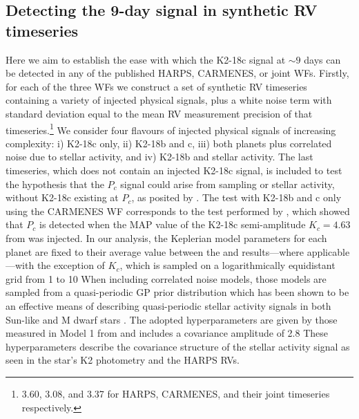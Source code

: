 \subsection{Detecting the 9-day signal in synthetic RV timeseries}
Here we aim to establish the ease with which the
K2-18c signal at $\sim 9$ days can be detected in any of the published HARPS,
CARMENES, or joint WFs. Firstly, for each of the three WFs we construct a set of synthetic RV
timeseries containing a variety of injected physical signals,
plus a white noise term with standard deviation equal to the mean
RV measurement precision of that timeseries.\footnote{ 3.60, 3.08, and 3.37 \mps{} for HARPS, CARMENES, and
  their joint timeseries respectively.} We consider four flavours of injected physical signals of increasing
complexity: i) K2-18c only, ii) K2-18b and c, iii) both planets plus correlated noise
due to stellar activity, and iv) K2-18b and stellar activity. The last timeseries, which does not contain an injected
K2-18c signal, is included to test the hypothesis that the $P_c$ signal could arise from sampling or stellar activity,
without K2-18c existing at $P_c$, as posited by .
The test with K2-18b and c only using the CARMENES WF corresponds
to the test performed by , which showed that $P_c$ is detected 
when the MAP value of the K2-18c semi-amplitude $K_c=4.63$ \mps{} from  was injected.
In our analysis, the Keplerian model parameters
for each planet are fixed to their average value between the  and 
results---where applicable---with the exception of $K_c$, which is sampled on a
logarithmically equidistant grid from 1 to 10  When including correlated noise models,
those models are sampled from a quasi-periodic GP prior distribution which has been shown to be
an effective means of describing quasi-periodic stellar activity signals in both Sun-like and M dwarf stars
\citep[e.g.][]{haywood14,cloutier17a}. The adopted hyperparameters are given by those measured in Model 1 from
 and includes a covariance amplitude of 2.8  These
hyperparameters describe the covariance structure of the stellar activity signal as seen in the star's K2 photometry
and the HARPS RVs. \\

